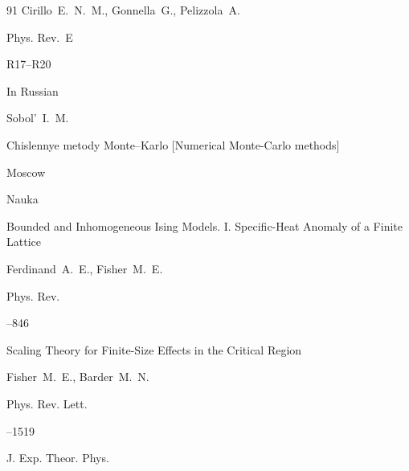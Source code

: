 \begin{thebibliography}{91}
\by  Cirillo~E.~N.~M., Gonnella~G., Pelizzola~A. 

\jour Phys. Rev.~E




\pages R17--R20





\lang In Russian

\by Sobol'~I.~M.

\book Chislennye metody Monte--Karlo \rm [Numerical Monte-Carlo methods]

\publaddr Moscow

\publ Nauka








\paper  Bounded and Inhomogeneous Ising Models. I. Specific-Heat Anomaly of a Finite Lattice

\by Ferdinand~A.~E., Fisher~M.~E.

\jour Phys. Rev.




--846





\paper   Scaling Theory for Finite-Size Effects in the Critical Region

\by  Fisher~M.~E.,  Barder~M.~N.

\jour Phys. Rev. Lett.




--1519





\jour J. Exp. Theor. Phys.




\end{thebibliography}
